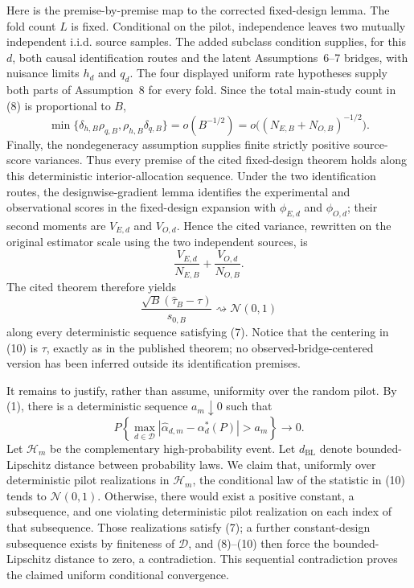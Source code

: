 Here is the premise-by-premise map to the corrected fixed-design lemma.  The fold count \(L\) is fixed.  Conditional on the pilot, independence leaves two mutually independent i.i.d. source samples.  The added subclass condition supplies, for this \(d\), both causal identification routes and the latent Assumptions~6--7 bridges, with nuisance limits \(h_d\) and \(q_d\).  The four displayed uniform rate hypotheses supply both parts of Assumption~8 for every fold.  Since the total main-study count in (8) is proportional to \(B\),
\[
 \min\{\delta_{h,B}\rho_{q,B},
          \rho_{h,B}\delta_{q,B}\}
 =o(B^{-1/2})
 =o\bigl((N_{E,B}+N_{O,B})^{-1/2}\bigr).                    \tag{9}
\]
Finally, the nondegeneracy assumption supplies finite strictly positive source-score variances.  Thus every premise of the cited fixed-design theorem holds along this deterministic interior-allocation sequence.  Under the two identification routes, the designwise-gradient lemma identifies the experimental and observational scores in the fixed-design expansion with \(\phi_{E,d}\) and \(\phi_{O,d}\); their second moments are \(V_{E,d}\) and \(V_{O,d}\).  Hence the cited variance, rewritten on the original estimator scale using the two independent sources, is
\[
 \frac{V_{E,d}}{N_{E,B}}+\frac{V_{O,d}}{N_{O,B}}.
\]
The cited theorem therefore yields
\[
 \frac{\sqrt B(\widehat\tau_B-\tau)}{s_{0,B}}
 \rightsquigarrow\mathcal N(0,1)                            \tag{10}
\]
along every deterministic sequence satisfying (7).  Notice that the centering in (10) is \(\tau\), exactly as in the published theorem; no observed-bridge-centered version has been inferred outside its identification premises.

It remains to justify, rather than assume, uniformity over the random pilot.  By (1), there is a deterministic sequence \(a_m\downarrow0\) such that
\[
 P\left\{
 \max_{d\in\mathcal D}
 |\widehat\alpha_{d,m}-\alpha_d^*(P)|>a_m
 \right\}\longrightarrow0.                                 \tag{11}
\]
Let \(\mathcal H_m\) be the complementary high-probability event.  Let \(d_{\mathrm{BL}}\) denote bounded-Lipschitz distance between probability laws.  We claim that, uniformly over deterministic pilot realizations in \(\mathcal H_m\), the conditional law of the statistic in (10) tends to \(\mathcal N(0,1)\).  Otherwise, there would exist a positive constant, a subsequence, and one violating deterministic pilot realization on each index of that subsequence.  Those realizations satisfy (7); a further constant-design subsequence exists by finiteness of \(\mathcal D\), and (8)--(10) then force the bounded-Lipschitz distance to zero, a contradiction.  This sequential contradiction proves the claimed uniform conditional convergence.

